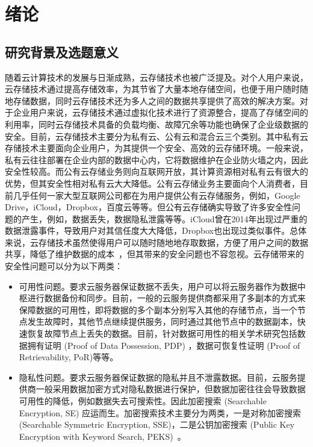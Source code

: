 \chapter{绪论}
\label{cha:intro}
\section{研究背景及选题意义}
随着云计算技术的发展与日渐成熟，云存储技术也被广泛提及。对个人用户来说，云存储技术通过提高存储效率，为其节省了大量本地存储空间，也便于用户随时随地存储数据，同时云存储技术还为多人之间的数据共享提供了高效的解决方案。对于企业用户来说，云存储技术通过虚拟化技术进行了资源整合，提高了存储空间的利用率，同时云存储技术具备的负载均衡、故障冗余等功能也确保了企业级数据的安全。目前，云存储技术主要分为私有云、公有云和混合云三个类别。其中私有云存储技术主要面向企业用户，为其提供一个安全、高效的云存储环境。一般来说，私有云往往部署在企业内部的数据中心内，它将数据维护在企业防火墙之内，因此安全性较高。而公有云存储业务则向互联网开放，其计算资源相对私有云有很大的优势，但其安全性相对私有云大大降低。公有云存储业务主要面向个人消费者，目前几乎任何一家大型互联网公司都在为用户提供公有云存储服务，例如，Google Drive，iCloud，Dropbox，百度云等等。但公有云存储确实导致了许多安全性问题的产生，例如，数据丢失，数据隐私泄露等等。iCloud曾在2014年出现过严重的数据泄露事件，导致用户对其信任度大大降低，Dropbox也出现过类似事件。总体来说，云存储技术虽然使得用户可以随时随地地存取数据，方便了用户之间的数据共享，降低了维护数据的成本~\cite{juels2007pors,ateniese2008scalable,kamara2011cs2,wang2011enabling,stefanov2012iris,kamara2013parallel,sun2015catch}，但其带来的安全问题也不容忽视。云存储带来的安全性问题可以分为以下两类：
\begin{itemize}
	\item 可用性问题。要求云服务器保证数据不丢失，用户可以将云服务器作为数据中枢进行数据备份和同步。目前，一般的云服务提供商都采用了多副本的方式来保障数据的可用性，即将数据的多个副本分别写入其他的存储节点，当一个节点发生故障时，其他节点继续提供服务，同时通过其他节点中的数据副本，快速恢复故障节点上丢失的数据。目前，针对数据可用性的相关学术研究包括数据拥有证明 (Proof of Data Possession, PDP)\cite{ateniese2007provable, ateniese2008scalable, erway2015dynamic,zhu2012cooperative} ，数据可恢复性证明 (Proof of Retrievability, PoR)\cite{juels2007pors, bowers2009proofs, stefanov2012iris}等等。
	\item 隐私性问题。要求云服务器保证数据的隐私并且不泄露数据。目前，云服务提供商一般采用数据加密方式对隐私数据进行保护，但数据加密往往会导致数据可用性的降低，例如数据失去可搜索性。因此加密搜索 (Searchable Encryption, SE) 应运而生。加密搜索技术主要分为两类，一是对称加密搜索 (Searchable Symmetric Encryption, SSE)\cite{song2000practical,curtmola2011searchable,kamara2012dynamic,cash2014dynamic,wang2016searchable}，二是公钥加密搜索 (Public Key Encryption with Keyword Search, PEKS)~\cite{boneh2004public}。
\end{itemize}

